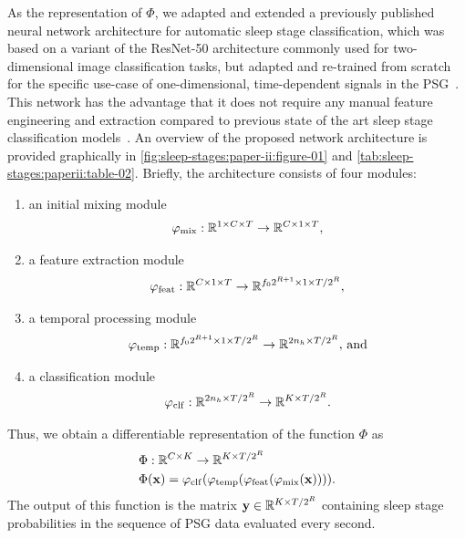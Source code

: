 As the representation of $\Phi$, we adapted and extended a previously published neural network architecture for automatic sleep stage classification, which was based on a variant of the ResNet-50 architecture commonly used for two-dimensional image classification tasks, but adapted and re-trained from scratch for the specific use-case of one-dimensional, time-dependent signals in the \ac{PSG}~\cite{Olesen2018c}.
This network has the advantage that it does not require any manual feature engineering and extraction compared to previous state of the art sleep stage classification models~\cite{Stephansen2018}.
An overview of the proposed network architecture is provided graphically in \cref{fig:sleep-stages:paper-ii:figure-01} and \cref{tab:sleep-stages:paperii:table-02}.
Briefly, the architecture consists of four modules:
\begin{enumerate}
    \item an initial mixing module 
    \begin{equation}
        \varphi_{\mathrm{mix}} : \mathbb{R}^{1 \times C \times T} \to \mathbb{R}^{C \times 1 \times T},
    \end{equation}%
	\item a feature extraction module
	\begin{equation}
	    \varphi_{\mathrm{feat}} : \mathbb{R}^{C \times 1 \times T} \to \mathbb{R}^{f_0 2^{R+1} \times 1 \times T/2^R},
	\end{equation}
	\item a temporal processing module
	\begin{equation}
	    \varphi_{\mathrm{temp}}     : \mathbb{R}^{f_0 2^{R+1} \times 1 \times T/2^R} \to \mathbb{R}^{2n_h \times T/2^R}, \, \text{and}
	\end{equation} %
	\item a classification module
	\begin{equation}
	    \varphi_{\mathrm{clf}} : \mathbb{R}^{2n_h \times T/2^R} \to \mathbb{R}^{K \times T/2^R}.
	\end{equation}%
\end{enumerate}
Thus, we obtain a differentiable representation of the function  $\Phi$ as
\begin{align}
\begin{split}
    &\Phi : \mathbb{R}^{C \times K} \to \mathbb{R}^{K \times T/2^R} \\
    &\Phi \lparen\mathbf{x}\rparen = \varphi_{\mathrm{clf}} \lparen \varphi_{\mathrm{temp}} \lparen \varphi_{\mathrm{feat}} \lparen \varphi_{\mathrm{mix}} \lparen \mathbf{x} \rparen \rparen \rparen \rparen.
\end{split}
\end{align}
The output of this function is the matrix $\mathbf{y} \in \mathbb{R}^{K \times T/2^R}$ containing sleep stage probabilities in the sequence of \ac{PSG} data evaluated every second.


